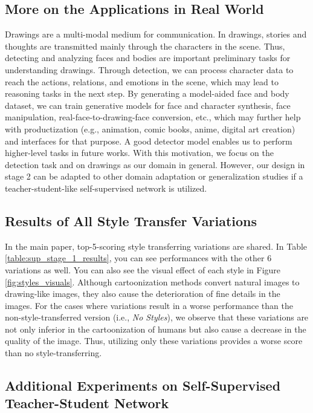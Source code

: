 \documentclass{article}
\begin{document}
\subsection{More on the Applications in Real World}

Drawings are a multi-modal medium for communication. In drawings, stories and thoughts are transmitted mainly through the characters in the scene. Thus, detecting and analyzing faces and bodies are important preliminary tasks for understanding drawings. Through detection, we can process character data to reach the actions, relations, and emotions in the scene, which may lead to reasoning tasks in the next step. By generating a model-aided face and body dataset, we can train generative models for face and character synthesis, face manipulation, real-face-to-drawing-face conversion, etc., which may further help with productization (e.g., animation, comic books, anime, digital art creation) and interfaces for that purpose. A good detector model enables us to perform higher-level tasks in future works. With this motivation, we focus on the detection task and on drawings as our domain in general. However, our design in stage 2 can be adapted to other domain adaptation or generalization studies if a teacher-student-like self-supervised network is utilized. 

\subsection{Results of All Style Transfer Variations}

In the main paper, top-5-scoring style transferring variations are shared. In Table \ref{table:sup_stage_1_results}, you can see performances with the other 6 variations as well. You can also see the visual effect of each style in Figure \ref{fig:styles_visuals}. Although cartoonization methods convert natural images to drawing-like images, they also cause the deterioration of fine details in the images. For the cases where variations result in a worse performance than the non-style-transferred version (i.e., \textit{No Styles}), we observe that these variations are not only inferior in the cartoonization of humans but also cause a decrease in the quality of the image. Thus, utilizing only these variations provides a worse score than no style-transferring.



\subsection{Additional Experiments on Self-Supervised Teacher-Student Network}
\end{document}
